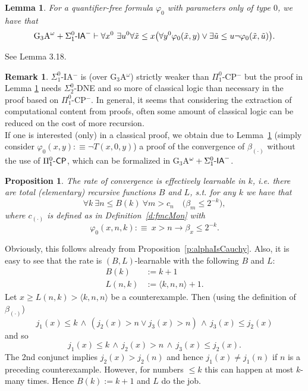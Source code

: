\documentclass[1p]{elsarticle}
\newcommand{\usftext}[1]{\textsf{\upshape #1}}
\newcommand{\IA}{\ensuremath{\usftext{IA}}} %
\newcommand{\CP}{\ensuremath{\usftext{CP}}}
\newcommand{\PiLm}{\ensuremath{\Pi^0_1\usftext{-}}}
\newcommand{\SiLm}{\ensuremath{\Sigma^0_1\usftext{-}}}
\theoremstyle{plain}
\newtheorem{lemma}[thm]{Lemma}
\newtheorem{prop}[thm]{Proposition}
\theoremstyle{definition}
\newtheorem{rmk}[thm]{Remark}
\theoremstyle{remark}
\renewenvironment{proof}[1][]{\noindent{\bf Proof{#1}. }}{\nopagebreak[4]{\hspace*{\fill}
  $\Box$              %
 }{\vspace{2ex}}}
\renewcommand{\phi}{\varphi}
\theoremstyle{definition}
\begin{document}
{\begin{lemma}\label{l:G3ACP} 
For a quantifier-free formula $\phi_0$ with parameters only of type $0$, we have that
\[
\mbox{\rm G$_3$A}^\omega + 
\SiLm\IA^- \vdash 
\forall x^0\ \exists u^0 
\forall\tilde x\leq x \big(  
\forall y^0 \phi_0(\tilde x,y)
\vee\exists\tilde u\leq u\neg\phi_0(\tilde x,\tilde u) \big).
\] 
\end{lemma}
\begin{proof}
See \cite{Kohlenbach(book)} Lemma 3.18.
\end{proof}

\begin{rmk}
$\Sigma^0_1$-IA$^-$ is (over G$_3$A$^{\omega}$) strictly weaker than 
$\Pi^0_1$-CP$^-$ but the proof in Lemma \ref{l:G3ACP} needs $\Sigma^0_2$-DNE 
and so more of classical logic than necessary in the proof based on 
$\Pi^0_1$-CP$^-$.
In general, it seems that considering the extraction of computational content 
from proofs, often some amount of classical logic can be reduced on the cost of more recursion.\\
If one is interested (only) in a classical proof, we obtain due to Lemma~\ref{l:G3ACP}
(simply consider $\varphi_0(x,y):\equiv \neg T(x,0,y)$) a proof of the 
convergence of $\beta_{(\cdot)}$ 
without the use of $\PiLm\CP$, which can be formalized in G$_3$A$^{\omega}+\SiLm\IA^-$.
\end{rmk}


\begin{prop}\label{p:alphaIsLearnable}
The rate of convergence is effectively learnable in $k$, i.e.
there are total (elementary) 
recursive functions $B$ and $L$, s.t. for any $k$ we have that
\[ \forall k\ \exists n\leq B(k)\ \forall m > c_n\quad \big(\beta_m\leq 2^{-k}\big),\]
where $c_{(\cdot)}$ is defined as in Definition~\ref{d:fmcMon} with
\[
\phi_0(x,n,k):\equiv\ x> n\rightarrow \beta_x\le 2^{-k}.
\]
\end{prop}
\begin{proof}
Obviously, this follows already from Proposition~\ref{p:alphaIsCauchy}. Also, it is easy to see that the 
rate is $(B,L)$-learnable with the following $B$ and $L$:
\begin{align*}
B(k)&:=k+1  \\
L(n,k)&:= \langle k,n,n \rangle+1.
\end{align*}
Let $x\ge L(n,k)>\langle k,n,n\rangle$ be a counterexample. Then (using 
the definition of $\beta_{(\cdot)}$)  
\[ j_1(x)\le k\,\wedge\,(j_2(x)>n\vee j_3(x)>n)\,\wedge \,j_3(x)\le j_2(x) \] 
and so 
\[ j_1(x)\le k\,\wedge\,j_2(x)>n\,\wedge\,j_3(x)\le j_2(x). \]
The 2nd conjunct implies $j_2(x)>j_2(n)$ and hence $j_1(x)\not= j_1(n)$ 
if $n$ is a preceding counterexample. However, for numbers $\le k$ this can 
happen at most $k$-many times. Hence $B(k):=k+1$ and $L$ do the job.
\end{proof}


}
\end{document}
